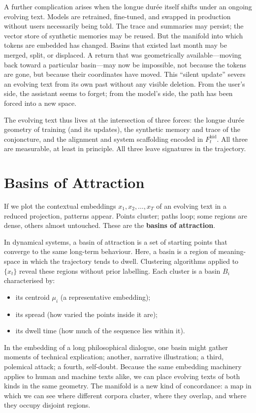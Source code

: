 \documentclass[12pt,a4paper]{article}
\begin{document}
A further complication arises when the longue dur\'ee itself shifts under an ongoing evolving text. Models are retrained, fine-tuned, and swapped in production without users necessarily being told. The trace and summaries may persist; the vector store of synthetic memories may be reused. But the manifold into which tokens are embedded has changed. Basins that existed last month may be merged, split, or displaced. A return that was geometrically available---moving back toward a particular basin---may now be impossible, not because the tokens are gone, but because their coordinates have moved. This ``silent update'' severs an evolving text from its own past without any visible deletion. From the user's side, the assistant seems to forget; from the model's side, the path has been forced into a new space.

The evolving text thus lives at the intersection of three forces: the longue dur\'ee geometry of training (and its updates), the synthetic memory and trace of the conjoncture, and the alignment and system scaffolding encoded in $F_t^{\text{hid}}$. All three are measurable, at least in principle. All three leave signatures in the trajectory.


\section{Basins of Attraction}

If we plot the contextual embeddings $x_1, x_2, \dots, x_T$ of an evolving text in a reduced projection, patterns appear. Points cluster; paths loop; some regions are dense, others almost untouched. These are the \textbf{basins of attraction}.

In dynamical systems, a basin of attraction is a set of starting points that converge to the same long-term behaviour. Here, a basin is a region of meaning-space in which the trajectory tends to dwell. Clustering algorithms applied to $\{x_t\}$ reveal these regions without prior labelling. Each cluster is a basin $B_i$ characterised by:

\begin{itemize}
  \item its centroid $\mu_i$ (a representative embedding);
  \item its spread (how varied the points inside it are);
  \item its dwell time (how much of the sequence lies within it).
\end{itemize}

In the embedding of a long philosophical dialogue, one basin might gather moments of technical explication; another, narrative illustration; a third, polemical attack; a fourth, self-doubt. Because the same embedding machinery applies to human and machine texts alike, we can place evolving texts of both kinds in the same geometry. The manifold is a new kind of concordance: a map in which we can see where different corpora cluster, where they overlap, and where they occupy disjoint regions.
\end{document}

